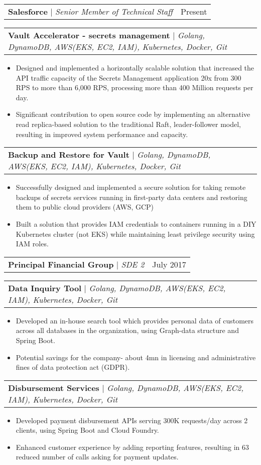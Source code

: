\documentclass[letterpaper,11pt]{article}
\makeatletter
\newcommand{\resumeItem}[1]{
  \item\small{
    {#1 \vspace{-2pt}}
  }
}
\newcommand{\resumeProjectHeading}[2]{
    \item
    \begin{tabular*}{0.97\textwidth}{l@{\extracolsep{\fill}}r}
      \small#1 & #2 \\
    \end{tabular*}\vspace{-7pt}
}
\newcommand{\resumeItemListStart}{\begin{itemize}}
\newcommand{\resumeItemListEnd}{\end{itemize}\vspace{-5pt}}
\makeatother
\begin{document}
        \resumeProjectHeading
          {\textbf{\large Salesforce} $|$ \footnotesize\emph{Senior Member of Technical Staff}\vspace{3pt}}{Present}

        \resumeProjectHeading
        {\textbf{Vault Accelerator - secrets management} $|$ \footnotesize\emph{Golang, DynamoDB, AWS(EKS, EC2, IAM), Kubernetes, Docker, Git}}{}
          \resumeItemListStart
            \resumeItem{Designed and implemented a horizontally scalable solution that increased the API traffic capacity of the Secrets Management application 20x from 300 RPS to more than 6,000 RPS, processing more than 400 Million requests per day.}
            \resumeItem{Significant contribution to open source code by implementing an alternative read replica-based solution to the traditional Raft, leader-follower model, resulting in improved system performance and capacity.}
        \resumeItemListEnd

        \resumeProjectHeading
        {\textbf{Backup and Restore for Vault} $|$ \footnotesize\emph{Golang, DynamoDB, AWS(EKS, EC2, IAM), Kubernetes, Docker, Git}}{}
          \resumeItemListStart
            \resumeItem{Successfully designed and implemented a secure solution for taking remote backups of secrets services running in first-party data centers and restoring them to public cloud providers (AWS, GCP)}
            \resumeItem{Built a solution that provides IAM credentials to containers running in a DIY Kubernetes cluster (not EKS) while maintaining least privilege security using IAM roles.}\vspace{8pt}
        \resumeItemListEnd

         \resumeProjectHeading
          {\textbf{\large Principal Financial Group} $|$ \footnotesize\emph{SDE 2}\vspace{3pt}}{July 2017}

          
         \resumeProjectHeading
        {\textbf{Data Inquiry Tool} $|$ \footnotesize\emph{Golang, DynamoDB, AWS(EKS, EC2, IAM), Kubernetes, Docker, Git}}{}
          \resumeItemListStart
            \resumeItem{Developed an in-house search tool which provides personal data of customers across all databases in the organization, using Graph-data structure and Spring Boot.}
            \resumeItem{Potential savings for the company- about 4mn in licensing and administrative fines of data protection act (GDPR).}
        \resumeItemListEnd

         \resumeProjectHeading
        {\textbf{Disbursement Services} $|$ \footnotesize\emph{Golang, DynamoDB, AWS(EKS, EC2, IAM), Kubernetes, Docker, Git}}{}
          \resumeItemListStart
            \resumeItem{Developed payment disbursement APIs serving 300K requests/day across 2 clients, using Spring Boot and Cloud Foundry.}
            \resumeItem{Enhanced customer experience by adding reporting features, resulting in 63 reduced number of calls asking for payment updates.}
        \resumeItemListEnd
          
\end{document}
